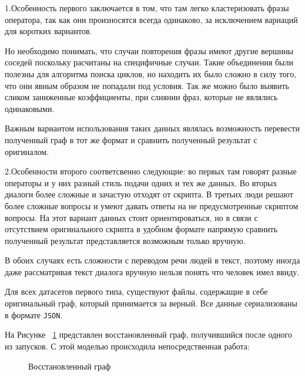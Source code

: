 \documentclass[times,specification,annotation]{itmo-student-thesis}
\begin{document}
	1.Особенность первого заключается в том, что там легко кластеризовать фразы оператора, так как они произносятся всегда одинаково, за исключением вариаций для коротких вариантов. 
	
	Но необходимо понимать, что случаи повторения фразы имеют другие вершины соседей поскольку расчитаны на специфичные случаи. Такие объединения были полезны для алгоритма поиска циклов, но находить их было сложно в силу того, что они явным образом не попадали под условия. Так же можно было выявить сликом заниженные коэффициенты, при слиянии фраз, которые не являлись одинаковыми. 
	
	Важным вариантом использования таких данных являлась возможность  перевести полученный граф в тот же формат и сравнить полученный результат с оригиналом.
	
	2.Особенности второго соответсвенно следующие: во первых там говорят разные операторы и у них разный стиль подачи одних и тех же данных. Во вторых диалоги более сложные и зачастую отходят от скрипта. В третьих люди решают более сложные вопросы и умеют давать ответы на не предусмотренные скриптом вопросы. На этот вариант данных стоит ориентироваться, но в связи с отсутствием оригинального скрипта в удобном формате напрямую сравнить полученный результат представляется возможным только вручную.
	
	В обоих случаях есть сложности с переводом речи людей в текст, поэтому иногда даже рассматривая текст диалога вручную нельзя понять что человек имел ввиду.
	
	Для всех датасетов первого типа, существуют файлы, содержащие в себе оригинальный граф, который принимается за верный. Все данные сериализованы в формате \texttt{JSON}. 
	
	На Рисунке ~\ref{fig:graph:restore} представлен восстановленный граф, получившийся после одного из запусков. С этой моделью происходила непосредственная работа:
	
	\begin{figure}[H]
		\caption{Восстановленный граф}
		\label{fig:graph:restore}
	\end{figure}
\end{document}
